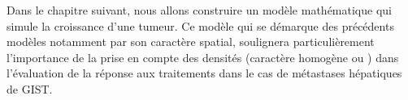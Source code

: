 \documentclass[main.tex]{subfiles}
\begin{document}
Dans le chapitre suivant, nous allons construire un modèle mathématique qui simule la croissance d'une tumeur. Ce modèle qui se démarque des précédents modèles notamment par son caractère spatial, soulignera particulièrement l'importance de la prise en compte des densités (caractère homogène ou \heterogene) dans l'évaluation de la réponse aux traitements dans le cas de métastases hépatiques de GIST.
\end{document}
